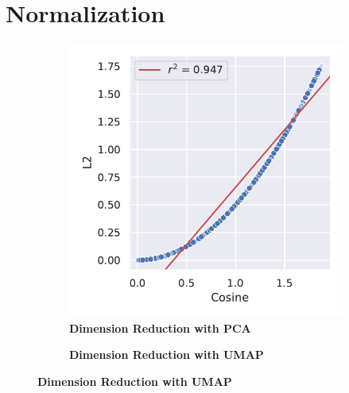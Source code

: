 \section{Normalization} \label{sec:L2_Normalization}

\blindtext
\autocite{pedregosa_scikit-learn_2011}

\blindtext

\begin{figure}
    \centering
    \begin{adjustbox}{minipage=\dimexpr{}\fboxrule,fbox}
        \begin{subfigure}[b]{0.475\textwidth}
            \caption[Dimension Reduction with \Acrshort{PCA}]{\textbf{Dimension Reduction with \Acrshort{PCA}}}
            \label{subfig:Normalisation_PCA}            \includegraphics[width=\textwidth]{PCA/Difference_Distance_Calculation.pdf}
        \end{subfigure}
        \hfill
        \begin{subfigure}[b]{0.475\textwidth}
            \caption[Dimension Reduction with \Acrshort{UMAP}]{\textbf{Dimension Reduction with \Acrshort{UMAP}}}

\end{subfigure}
\end{adjustbox}
\end{figure}
